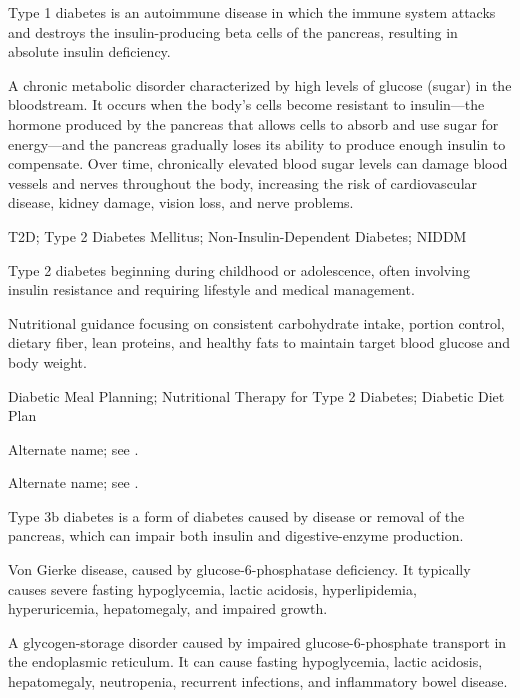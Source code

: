  Type 1 diabetes is an autoimmune disease in which the immune system attacks and destroys
the insulin-producing beta cells of the pancreas, resulting in absolute insulin
deficiency.

 A chronic metabolic disorder characterized by high levels of glucose (sugar) in the bloodstream. It occurs when the body's cells become resistant to insulin---the hormone produced by the pancreas that allows cells to absorb and use sugar for energy---and the pancreas gradually loses its ability to produce enough insulin to compensate. Over time, chronically elevated blood sugar levels can damage blood vessels and nerves throughout the body, increasing the risk of cardiovascular disease, kidney damage, vision loss, and nerve problems.


\synonyms
T2D; Type 2 Diabetes Mellitus; Non-Insulin-Dependent Diabetes; NIDDM

 Type 2 diabetes beginning during childhood or adolescence, often involving insulin resistance and requiring lifestyle and medical management.

 Nutritional guidance focusing on consistent carbohydrate intake, portion control, dietary fiber, lean proteins, and healthy fats to maintain target blood glucose and body weight.

\synonyms
Diabetic Meal Planning; Nutritional Therapy for Type 2 Diabetes; Diabetic Diet Plan

 Alternate name; see .

 Alternate name; see .

 Type 3b diabetes is a form of diabetes caused by disease or removal of the pancreas, which can impair both insulin and digestive-enzyme production.

 Von Gierke disease, caused by glucose-6-phosphatase deficiency. It typically causes severe fasting hypoglycemia, lactic acidosis, hyperlipidemia, hyperuricemia, hepatomegaly, and impaired growth.

 A glycogen-storage disorder caused by impaired glucose-6-phosphate transport in the endoplasmic reticulum. It can cause fasting hypoglycemia, lactic acidosis, hepatomegaly, neutropenia, recurrent infections, and inflammatory bowel disease.

